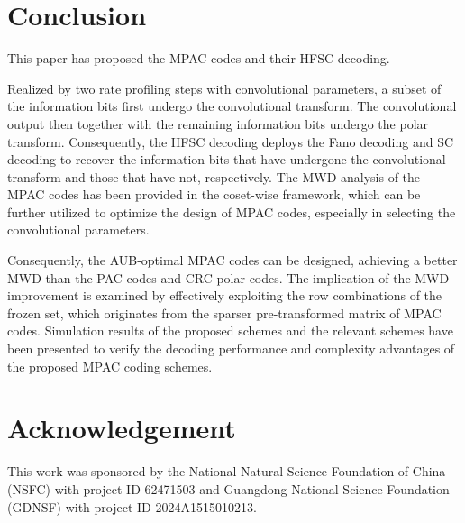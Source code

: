 \documentclass[12pt, draftclsnofoot, peerreview, onecolumn]{IEEEtran}
\theoremstyle{noparent}
\begin{document}
\section{Conclusion}
\label{sec7}
This paper has proposed the MPAC codes and their HFSC decoding. 

Realized by two rate profiling steps with convolutional parameters,
a subset of the information bits first undergo the convolutional transform. 
The convolutional output then together with the remaining information bits 
undergo the polar transform. 
Consequently, the HFSC decoding deploys the Fano decoding and SC decoding 
to recover the information bits that have undergone the convolutional transform and 
those that have not, respectively. 
The MWD analysis of the MPAC codes has been provided in the coset-wise framework, 
which can be further utilized to optimize the design of MPAC codes, 
especially in selecting the convolutional parameters. 



Consequently, the AUB-optimal MPAC codes can be designed, 
achieving a better MWD than the PAC codes and CRC-polar codes. 
The implication of the MWD improvement is examined by effectively exploiting the row combinations of the frozen set, which originates from the sparser pre-transformed matrix of MPAC codes. 
Simulation results of the proposed schemes and the relevant schemes 
have been presented to verify the decoding performance and complexity advantages 
of the proposed MPAC coding schemes.









\section*{Acknowledgement}
This work was sponsored by the National Natural Science
Foundation of China (NSFC) with project ID 62471503 
and Guangdong National Science Foundation (GDNSF) with project ID 2024A1515010213.


















































        
\end{document}

